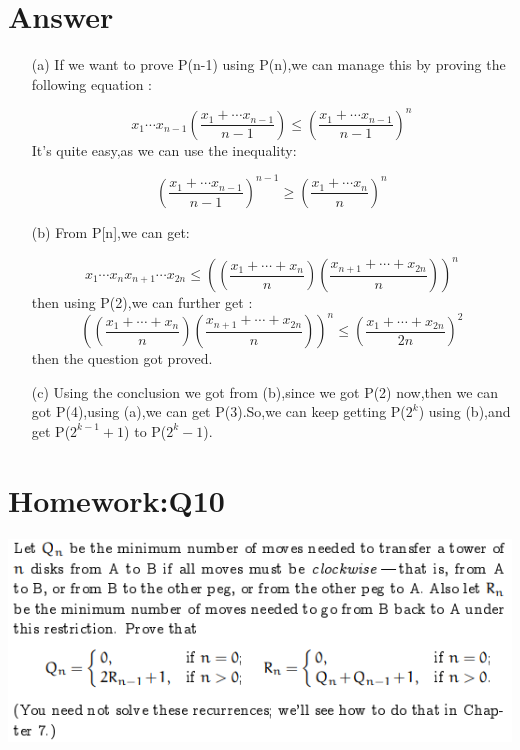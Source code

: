 \documentclass[a4paper]{article}
\begin{document}
\section*{Answer}
\begin{enumerate}
	\item[(a)]
		If we want to prove P(n-1) using P(n),we can manage this by proving the following equation :\par 
		\begin{equation}
			x_{1}\cdots x_{n-1} (\frac{x_{1}+\cdots x_{n-1}}{n-1}) \le (\frac{x_{1}+\cdots x_{n-1}}{n-1})^{n}
		\end{equation}
	It's quite easy,as we can use the inequality:\par 
	\begin{equation}
		(\frac{x_{1}+\cdots x_{n-1}}{n-1})^{n-1} \ge (\frac{x_{1}+\cdots x_{n}}{n})^{n}
	\end{equation}
	\item[(b)]
	From P[n],we can get:\par
	\begin{equation}
		x_{1}\cdots x_{n}x_{n+1}\cdots x_{2n} \le ((\frac{x_{1}+\cdots+ x_{n}}{n})(\frac{x_{n+1}+\cdots+ x_{2n}}{n}))^{n}
	\end{equation}
then using P(2),we can further get :
	\begin{equation}
		((\frac{x_{1}+\cdots+ x_{n}}{n})(\frac{x_{n+1}+\cdots+ x_{2n}}{n}))^{n}
		\le
		(\frac{x_{1}+\cdots+ x_{2n}}{2n})^{2}
	\end{equation}
then the question got proved.\par 
	\item[(c)]
	Using the conclusion we got from (b),since we got P(2) now,then we can got P(4),using (a),we can get P(3).So,we can keep getting P($2^{k}$) using (b),and get P($2^{k-1}+1$) to P($2^{k}-1$).
\end{enumerate}

\section*{Homework:Q10}
\includegraphics[scale=1.2]{Q10.png}
\end{document}
